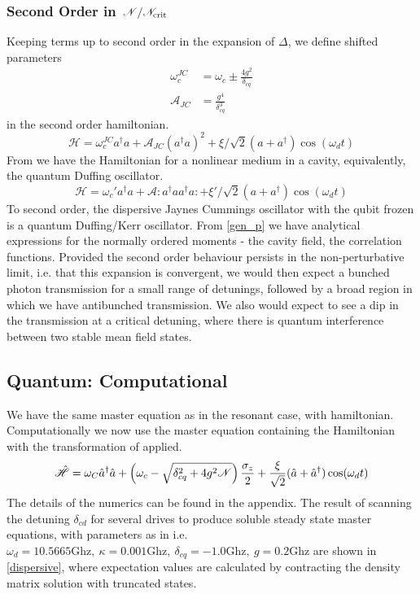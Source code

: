 \subsubsection{Second Order in $\flatfrac{\mathscr{N}}{\mathscr{N}_{\text{crit}}}$}
Keeping terms up to second order in the expansion of $\Delta$, we define shifted parameters
\begin{align*}
    \omega_c^{JC} &= \omega_c \pm \frac{4g^2}{\delta_{cq}}\\
    \mathscr{A}_{JC} &= \frac{g^4}{\delta_{cq}^3}
\end{align*}
in the second order hamiltonian. 
\begin{equation}
    \mathscr{H} = \omega_c^{JC} a ^ \dagger a
    + \mathscr{A}_{JC}\left(a^\dagger a\right)^2
    + \xi/\sqrt{2} ( a + a^\dagger ) \cos(\omega_d t)
\end{equation}
From \cite{Drummond1979} we have the Hamiltonian for a nonlinear medium in a cavity, equivalently, the quantum Duffing oscillator. 
\begin{equation}
    \mathscr{H} = \omega_c' a^\dagger a
    + \mathscr{A} : a ^ \dagger a a ^ \dagger a :
    + \xi'/\sqrt{2}(a+a^\dagger)\cos(\omega_d t)\label{duff}
\end{equation}
To second order, the dispersive Jaynes Cummings oscillator with the qubit frozen is a quantum Duffing/Kerr oscillator. 
From \cref{gen_p} we have analytical expressions for the normally ordered moments - the cavity field, the correlation functions. 
Provided the second order behaviour persists in the non-perturbative limit, i.e. that this expansion is convergent, we would then expect a bunched photon transmission for a small range of detunings, followed by a broad region in which we have antibunched transmission.
We also would expect to see a dip in the transmission at a critical detuning, where there is quantum interference between two stable mean field states.
\subsection{Quantum: Computational}
We have the same master equation as in the resonant case, with hamiltonian. Computationally we now use the master equation containing the Hamiltonian with the transformation of  \cite{Carbonaro1979} applied.
\begin{equation}
  \hat{\mathscr{H}} = \omega_C {\hat{a}^\dagger} \hat{a} + \left(\omega_c - \sqrt{\delta_{cq}^2 + 4g^2\mathscr{N}}\right)\frac{\sigma_z}{2} + \frac{\xi}{\sqrt{2}} ( \hat{a} + {\hat{a}^\dagger} ) \cos(\omega_d t) 
\end{equation}
The details of the numerics can be found in the appendix. 
The result of scanning the detuning $\delta_{cd}$ for several drives to produce soluble steady state master equations, with parameters as in \cite{Bishop2010} i.e. $\omega_d = 10.5665\text{Ghz}, \  \kappa = 0.001 \text{Ghz}, \  \delta_{cq} = -1.0 \text{Ghz}, \  g = 0.2\text{Ghz}$ are shown in \cref{dispersive}, where expectation values are calculated by contracting the density matrix solution with truncated states.
